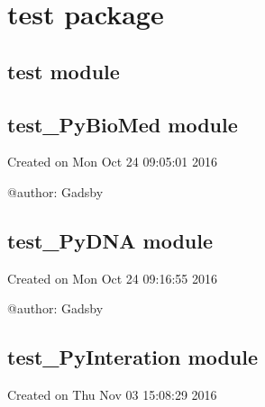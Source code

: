 \documentclass[letterpaper,10pt,english]{sphinxmanual}
\begin{document}
\section{test package}
\label{reference/test::doc}\label{reference/test:test-package}

\subsection{test module}
\label{reference/test2::doc}\label{reference/test2:test-module}\label{reference/test2:module-test}

\subsection{test\_PyBioMed module}
\label{reference/test_PyBioMed::doc}\label{reference/test_PyBioMed:test-pybiomed-module}\label{reference/test_PyBioMed:module-test_PyBioMed}
Created on Mon Oct 24 09:05:01 2016

@author: Gadsby

\begin{fulllineitems}
\label{reference/test_PyBioMed:test_PyBioMed.test_pybiomed}
\end{fulllineitems}



\subsection{test\_PyDNA module}
\label{reference/test_PyDNA:test-pydna-module}\label{reference/test_PyDNA::doc}\label{reference/test_PyDNA:module-test_PyDNA}
Created on Mon Oct 24 09:16:55 2016

@author: Gadsby

\begin{fulllineitems}
\label{reference/test_PyDNA:test_PyDNA.test_pydna}
\end{fulllineitems}



\subsection{test\_PyInteration module}
\label{reference/test_PyInteration:test-pyinteration-module}\label{reference/test_PyInteration::doc}\label{reference/test_PyInteration:module-test_PyInteration}
Created on Thu Nov 03 15:08:29 2016
\end{document}
